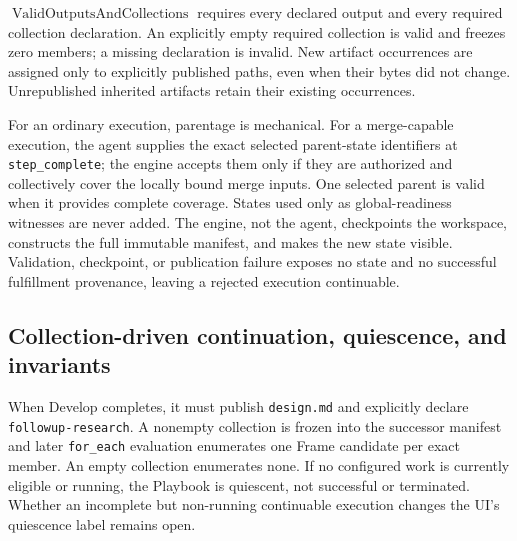 \documentclass[11pt]{article}
\newcommand{\artifact}[1]{\texttt{#1}}
\begin{document}
\(\operatorname{ValidOutputsAndCollections}\) requires every declared output and
every required collection declaration. An explicitly empty required collection
is valid and freezes zero members; a missing declaration is invalid. New
artifact occurrences are assigned only to explicitly published paths, even
when their bytes did not change. Unrepublished inherited artifacts retain their
existing occurrences.

For an ordinary execution, parentage is mechanical. For a merge-capable
execution, the agent supplies the exact selected parent-state identifiers at
\texttt{step\_complete}; the engine accepts them only if they are authorized
and collectively cover the locally bound merge inputs. One selected parent is
valid when it provides complete coverage. States used only as global-readiness
witnesses are never added. The engine, not the agent, checkpoints the workspace,
constructs the full immutable manifest, and makes the new state visible.
Validation, checkpoint, or publication failure exposes no state and no
successful fulfillment provenance, leaving a rejected execution continuable.

\subsection{Collection-driven continuation, quiescence, and invariants}

When Develop completes, it must publish \artifact{design.md} and explicitly
declare \texttt{followup-research}. A nonempty collection is frozen into the
successor manifest and later \texttt{for\_each} evaluation enumerates one Frame
candidate per exact member. An empty collection enumerates none. If no
configured work is currently eligible or running, the Playbook is quiescent,
not successful or terminated. Whether an incomplete but non-running
continuable execution changes the UI's quiescence label remains open.
\end{document}
